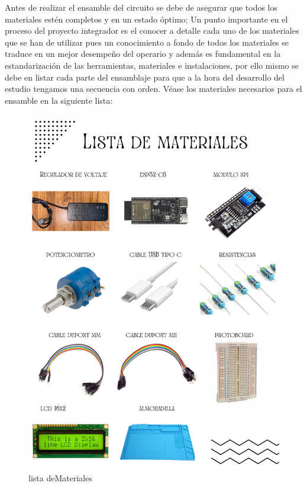     Antes de realizar el ensamble del circuito se debe de asegurar que todos los materiales estén completos y en un estado óptimo; Un punto importante en el proceso del proyecto integrador es el conocer a detalle cada uno de los materiales que se han de utilizar pues un conocimiento a fondo de todos los materiales se traduce en un mejor desempeño del operario y además es fundamental en la estandarización de las herramientas, materiales e instalaciones, por ello mismo se debe en listar cada parte del ensamblaje para que a la hora del desarrollo del estudio tengamos una secuencia con orden. Véase los materiales necesarios para el ensamble en la siguiente lista:
    \begin{figure}[H]
        \centering
        \includegraphics[scale=0.4]{35/Img/listaMateriales.pdf}
        \caption{lista deMateriales}
        \label{fig:listamateriales}
    \end{figure}
